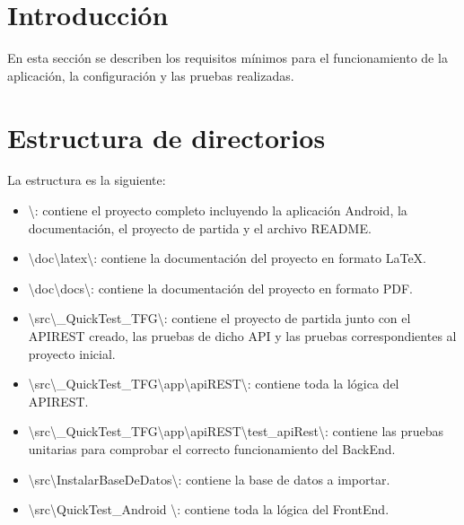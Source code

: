 
\section{Introducción}

En esta sección se describen los requisitos mínimos para el funcionamiento de la aplicación, la configuración y las pruebas realizadas.

\section{Estructura de directorios}

La estructura es la siguiente:

\begin{itemize}
	\item \textbackslash{}: contiene el proyecto completo incluyendo la aplicación Android, la documentación, el proyecto de partida y el archivo README.
	\item \textbackslash{}doc\textbackslash{}latex\textbackslash{}: contiene la documentación del proyecto en formato \LaTeX.
	
	\item \textbackslash{}doc\textbackslash{}docs\textbackslash{}: contiene la documentación del proyecto en formato PDF.
	
	\item \textbackslash{}src\textbackslash{}\_QuickTest\_TFG\textbackslash{}: contiene el proyecto de partida junto con el APIREST creado, las pruebas de dicho API y las pruebas correspondientes al proyecto inicial.
	
	\item \textbackslash{}src\textbackslash{}\_QuickTest\_TFG\textbackslash{}app\textbackslash{}apiREST\textbackslash{}: contiene toda la lógica del APIREST.
	
	\item \textbackslash{}src\textbackslash{}\_QuickTest\_TFG\textbackslash{}app\textbackslash{}apiREST\textbackslash{}test\_apiRest\textbackslash{}: contiene las pruebas unitarias para comprobar el correcto funcionamiento del BackEnd.
	
	\item \textbackslash{}src\textbackslash{}InstalarBaseDeDatos\textbackslash{}: contiene la base de datos a importar.
	
	\item \textbackslash{}src\textbackslash{}QuickTest\_Android		\textbackslash{}: contiene toda la lógica del FrontEnd.
	

\end{itemize}
